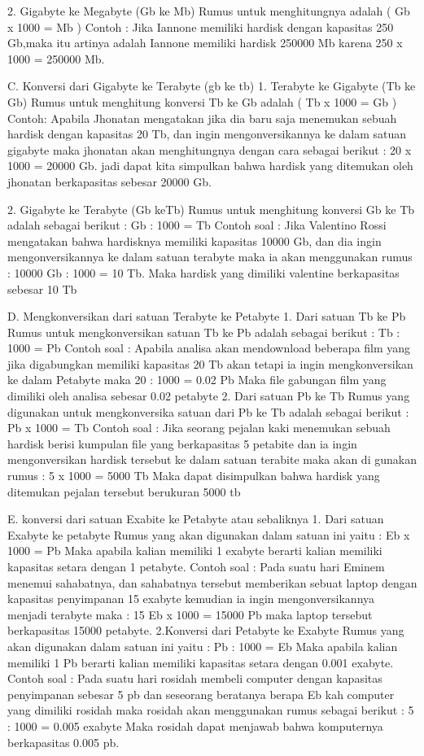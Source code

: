2.	Gigabyte ke Megabyte (Gb ke Mb)
Rumus untuk menghitungnya adalah ( Gb x 1000 = Mb )
Contoh :
Jika Iannone memiliki hardisk dengan kapasitas 250 Gb,maka itu artinya adalah Iannone memiliki hardisk 250000 Mb karena 250 x 1000 = 250000 Mb.

C. Konversi dari Gigabyte ke Terabyte (gb ke tb)
1. Terabyte ke Gigabyte (Tb ke Gb)
Rumus untuk menghitung konversi Tb ke Gb adalah ( Tb x 1000 = Gb )
Contoh:
Apabila Jhonatan mengatakan jika dia baru saja menemukan sebuah hardisk dengan kapasitas 20 Tb, dan ingin mengonversikannya ke dalam satuan gigabyte maka jhonatan akan menghitungnya dengan cara sebagai berikut :
20 x 1000 = 20000 Gb.
jadi dapat kita simpulkan bahwa  hardisk yang ditemukan oleh jhonatan berkapasitas sebesar 20000 Gb.

2.	Gigabyte ke Terabyte (Gb keTb)
Rumus untuk menghitung konversi Gb ke Tb  adalah sebagai berikut :
 Gb : 1000 = Tb
Contoh soal :
Jika Valentino Rossi mengatakan bahwa hardisknya memiliki kapasitas 10000 Gb, dan dia ingin mengonversikannya ke dalam satuan terabyte maka ia akan menggunakan rumus :
10000 Gb : 1000 = 10 Tb.
Maka hardisk yang dimiliki valentine berkapasitas sebesar 10 Tb

D. Mengkonversikan dari satuan Terabyte ke Petabyte
1.	Dari satuan Tb ke Pb
Rumus untuk mengkonversikan satuan Tb ke Pb adalah sebagai berikut :
Tb : 1000 = Pb
Contoh soal :
Apabila analisa akan mendownload beberapa film yang jika digabungkan memiliki kapasitas 20 Tb akan tetapi ia ingin mengkonversikan ke dalam Petabyte maka 
20 : 1000 = 0.02 Pb
Maka file gabungan film yang dimiliki oleh analisa sebesar 0.02 petabyte
2. Dari satuan Pb ke Tb
Rumus yang digunakan untuk mengkonversika satuan dari Pb ke Tb adalah sebagai berikut :
Pb x 1000 = Tb
Contoh soal :
Jika seorang pejalan kaki menemukan sebuah hardisk berisi kumpulan file yang berkapasitas 5 petabite dan ia ingin mengonversikan hardisk tersebut ke dalam satuan terabite maka akan di gunakan rumus :
5 x 1000 = 5000 Tb
Maka dapat disimpulkan bahwa hardisk yang ditemukan pejalan tersebut berukuran 5000 tb

E. konversi dari satuan Exabite ke Petabyte atau sebaliknya
1. Dari satuan Exabyte ke petabyte
Rumus yang akan digunakan dalam satuan ini yaitu :
Eb x 1000 = Pb
Maka apabila kalian memiliki 1 exabyte berarti kalian memiliki kapasitas setara dengan 1 petabyte.
Contoh soal :
Pada suatu hari Eminem menemui sahabatnya, dan sahabatnya tersebut memberikan sebuat laptop dengan kapasitas penyimpanan 15 exabyte kemudian ia ingin mengonversikannya menjadi terabyte maka :
15 Eb x 1000 = 15000 Pb maka laptop tersebut berkapasitas 15000 petabyte.
2.Konversi dari Petabyte ke Exabyte
Rumus yang akan digunakan dalam satuan ini yaitu :
Pb : 1000 = Eb
Maka apabila kalian memiliki 1 Pb berarti kalian memiliki kapasitas setara dengan 0.001 exabyte.
Contoh soal :
Pada suatu hari rosidah membeli computer dengan kapasitas penyimpanan sebesar 5 pb dan seseorang beratanya berapa Eb kah computer yang dimiliki rosidah maka rosidah akan menggunakan rumus sebagai berikut :
5 : 1000 = 0.005 exabyte
Maka rosidah dapat menjawab bahwa komputernya berkapasitas 0.005 pb.

